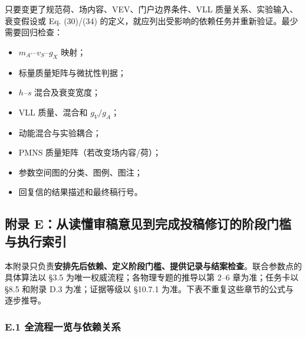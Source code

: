 \documentclass[
  chinese,
  UTF8]{ctexart}
\providecommand{\tightlist}{%
  \setlength{\itemsep}{0pt}\setlength{\parskip}{0pt}}
\begin{document}
只要变更了规范荷、场内容、VEV、门户边界条件、VLL
质量关系、实验输入、衰变假设或 Eq. (30)/(34)
的定义，就应列出受影响的依赖任务并重新验证。最少需要回归检查：

\begin{itemize}
\tightlist
\item
  \(m_{A'}\)--\(v_S\)--\(g_X\) 映射；
\item
  标量质量矩阵与微扰性判据；
\item
  \(h\)--\(s\) 混合及衰变宽度；
\item
  VLL 质量、混合和 \(g_V/g_A\)；
\item
  动能混合与实验耦合；
\item
  PMNS 质量矩阵（若改变场内容/荷）；
\item
  参数空间图的分类、图例、图注；
\item
  回复信的结果描述和最终稿行号。
\end{itemize}

\subsection{附录
E：从读懂审稿意见到完成投稿修订的阶段门槛与执行索引}\label{ux9644ux5f55-eux4eceux8bfbux61c2ux5ba1ux7a3fux610fux89c1ux5230ux5b8cux6210ux6295ux7a3fux4feeux8ba2ux7684ux9636ux6bb5ux95e8ux69dbux4e0eux6267ux884cux7d22ux5f15}

本附录只负责\textbf{安排先后依赖、定义阶段门槛、提供记录与结案检查}。联合参数点的具体算法以
§3.5 为唯一权威流程；各物理专题的推导以第 2--6 章为准；任务卡以 §8.5
和附录 D.3 为准；证据等级以 §10.7.1
为准。下表不重复这些章节的公式与逐步推导。

\subsubsection{E.1
全流程一览与依赖关系}\label{e.1-ux5168ux6d41ux7a0bux4e00ux89c8ux4e0eux4f9dux8d56ux5173ux7cfb}
\end{document}

